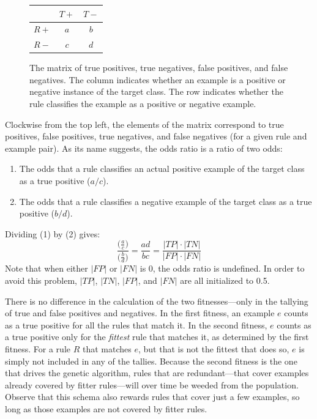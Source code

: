 \documentclass[11pt]{article}
\begin{document}
\begin{figure}[h!]
\centering
\begin{tabular}{c|cc}
& $T+$ & $T-$ \\
\hline
$R+$ & $a$ & $b$ \\
$R-$ & $c$ & $d$ \\
\end{tabular}
\caption{The matrix of true positives, true negatives, false positives, and false negatives. The column indicates whether an example is a positive or negative instance of the target class. The row indicates whether the rule classifies the example as a positive or negative example.}
\label{odds_ratio}
\end{figure}
Clockwise from the top left, the elements of the matrix correspond to true positives, false positives, true negatives, and false negatives (for a given rule and example pair). As its name suggests, the odds ratio is a ratio of two odds:

\begin{enumerate}
\item The odds that a rule classifies an actual positive example of the target class as a true positive ($a/c$).
\item The odds that a rule classifies a negative example of the target class as a true positive ($b/d$).
\end{enumerate}
Dividing (1) by (2) gives:
$$\frac{\Big(\frac{a}{c}\Big)}{\Big(\frac{b}{d}\Big)} = \frac{ad}{bc} = \frac{|TP| \cdot |TN|}{|FP| \cdot |FN|}$$
Note that when either $|FP|$ or $|FN|$ is 0, the odds ratio is undefined. In order to avoid this problem, $|TP|$, $|TN|$, $|FP|$, and $|FN|$ are all initialized to 0.5.

There is no difference in the calculation of the two fitnesses---only in the tallying of true and false positives and negatives. In the first fitness, an example $e$ counts as a true positive for all the rules that match it. In the second fitness, $e$ counts as a true positive only for the \emph{fittest} rule that matches it, as determined by the first fitness. For a rule $R$ that matches $e$, but that is not the fittest that does so, $e$ is simply not included in any of the tallies. Because the second fitness is the one that drives the genetic algorithm, rules that are redundant---that cover examples already covered by fitter rules---will over time be weeded from the population. Observe that this schema also rewards rules that cover just a few examples, so long as those examples are not covered by fitter rules.
\end{document}
